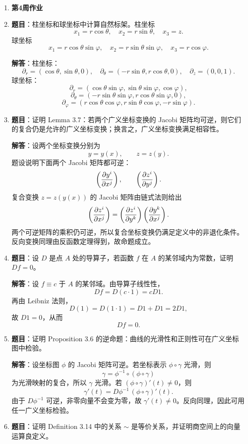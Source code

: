 \documentclass[UTF8,12pt,a4paper]{ctexart}
\newcommand{\homeworkweek}[1]{%
  \item[]\vspace{0.35em}\noindent\textbf{\large #1}\vspace{0.15em}
}
\begin{document}
\begin{enumerate}
\homeworkweek{第4周作业}
\item \textbf{题目}：柱坐标和球坐标中计算自然标架。柱坐标
\[
x_1=r\cos\theta,\quad x_2=r\sin\theta,\quad x_3=z.
\]
球坐标
\[
x_1=r\cos\theta\sin\varphi,\quad x_2=r\sin\theta\sin\varphi,\quad x_3=r\cos\varphi.
\]

\textbf{解答}：柱坐标：
\[
\boxed{\partial_r=(\cos\theta,\sin\theta,0),\quad
\partial_\theta=(-r\sin\theta,r\cos\theta,0),\quad
\partial_z=(0,0,1).}
\]
球坐标：
\[
\boxed{\partial_r=(\cos\theta\sin\varphi,\sin\theta\sin\varphi,\cos\varphi),}
\]
\[
\boxed{\partial_\theta=(-r\sin\theta\sin\varphi,r\cos\theta\sin\varphi,0),}
\]
\[
\boxed{\partial_\varphi=(r\cos\theta\cos\varphi,r\sin\theta\cos\varphi,-r\sin\varphi).}
\]

\item \textbf{题目}：证明 Lemma 3.7：若两个广义坐标变换的 Jacobi 矩阵均可逆，则它们的复合仍是允许的广义坐标变换；换言之，广义坐标变换满足相容性。

\textbf{解答}：设两个坐标变换分别为
\[
y=y(x),\qquad z=z(y).
\]
题设说明下面两个 Jacobi 矩阵都可逆：
\[
\left({\partial y^i\over\partial x^j}\right),\qquad
\left({\partial z^i\over\partial y^j}\right).
\]
复合变换 $z=z(y(x))$ 的 Jacobi 矩阵由链式法则给出
\[
\left({\partial z^i\over\partial x^j}\right)
=
\left({\partial z^i\over\partial y^k}\right)
\left({\partial y^k\over\partial x^j}\right).
\]
两个可逆矩阵的乘积仍可逆，所以复合坐标变换仍满足定义中的非退化条件。反向变换同理由反函数定理得到，故命题成立。

\item \textbf{题目}：设 $D$ 是点 $A$ 处的导算子，若函数 $f$ 在 $A$ 的某邻域内为常数，证明 $Df=0$。

\textbf{解答}：设 $f\equiv c$ 于 $A$ 的某邻域。由导算子线性性，
\[
D f=D(c\cdot 1)=cD1.
\]
再由 Leibniz 法则，
\[
D(1)=D(1\cdot1)=D1+D1=2D1,
\]
故 $D1=0$，从而
\[
\boxed{Df=0.}
\]

\item \textbf{题目}：证明 Proposition 3.6 的逆命题：曲线的光滑性和正则性可在广义坐标图中检验。

\textbf{解答}：设坐标图 $\phi$ 的 Jacobi 矩阵可逆。若坐标表示 $\phi\circ\gamma$ 光滑，则
\[
\gamma=\phi^{-1}\circ(\phi\circ\gamma)
\]
为光滑映射的复合，所以 $\gamma$ 光滑。若 $(\phi\circ\gamma)'(t)\ne0$，则
\[
\gamma'(t)=D\phi^{-1}\,(\phi\circ\gamma)'(t).
\]
由于 $D\phi^{-1}$ 可逆，非零向量不会变为零，故 $\gamma'(t)\ne0$。反向同理，因此可用任一广义坐标检验。

\item \textbf{题目}：证明 Definition 3.14 中的关系 $\sim$ 是等价关系，并证明商空间上的向量运算良定义。


\end{enumerate}
\end{document}
